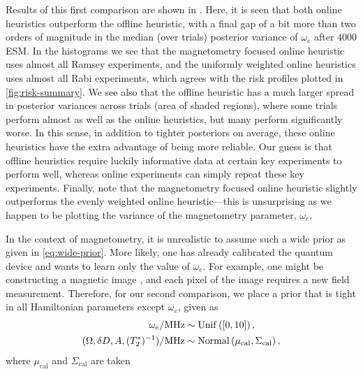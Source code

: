 \documentclass[aps,nofootinbib,twocolumn,superscriptaddress]{revtex4}
\newcommand{\calib}{{\text{cal}}}
\begin{document}
Results of this first comparison
are shown in .
Here, it is seen that both online heuristics outperform the offline heuristic, with a final
gap of a bit more than two orders of magnitude in the median (over trials)
posterior variance of $\omega_e$ after $4000$ ESM.
In the histograms we see that the magnetometry focused online heuristic
uses almost all Ramsey experiments, and the uniformly weighted online heuristics uses
almost all Rabi experiments, which agrees with the risk profiles
plotted in \autoref{fig:risk-summary}.
We see also that the offline heuristic has a much larger spread in posterior
variances across trials (area of shaded regions),
where some trials perform almost as well as the online heuristics,
but many perform significantly worse.
In this sense, in addition to tighter posteriors on average,
these online heuristics have the extra advantage of being
more reliable.
Our guess is that offline heuristics require luckily informative data at certain key
experiments to perform well, whereas online experiments can simply repeat these key
experiments.
Finally, note that the magnetometry focused
online heuristic slightly
outperforms the evenly weighted online heuristic---this
is unsurprising as we happen to be plotting the variance of the magnetometry
parameter, $\omega_e$.

In the context of magnetometry, it is unrealistic to assume such a
wide prior as given in \autoref{eq:wide-prior}.
More likely, one has already calibrated the quantum device and wants to
learn only the value of $\omega_e$.
For example, one might be constructing a magnetic image
\cite{
    maletinsky_robust_2012,
    grinolds_nanoscale_2013,
    rondin_strayfield_2013},
and each
pixel of the image requires a new field measurement.
Therefore, for our second comparison, we place a prior that is tight in all
Hamiltonian parameters except $\omega_e$, given as
\begin{subequations}
\begin{align}
    \omega_e/\si{MHz}
        &\sim \uniformdist\left( [0, 10] \right), \\
    (\Omega,\delta D,A,(T_2^*)^{-1})/\si{MHz}
        &\sim \normaldist\left(
            \mu_\calib,
            \Sigma_\calib
        \right),
\end{align}
\label{eq:calibrated-prior}%
\end{subequations}
where $\mu_\calib$ and $\Sigma_\calib$ are taken
\end{document}
